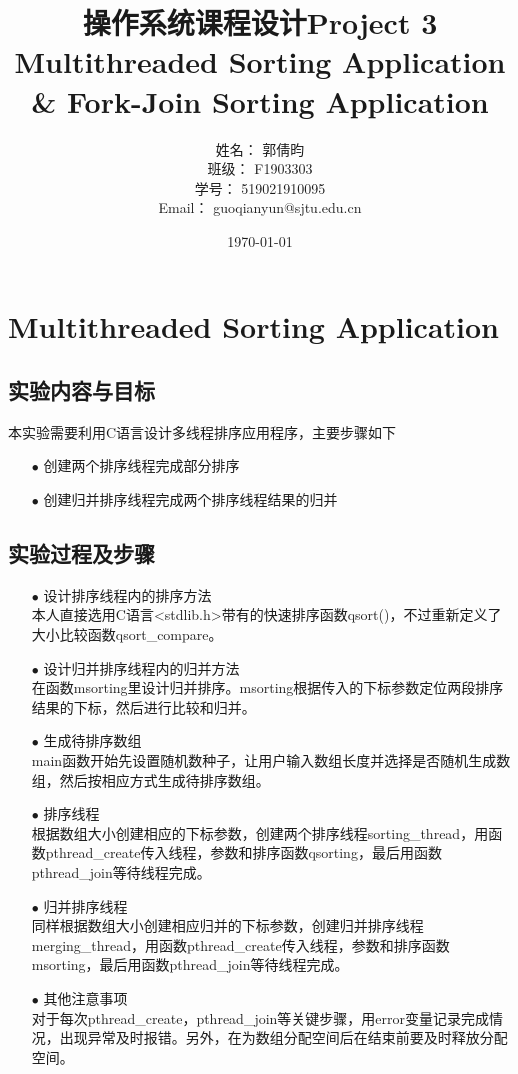 \documentclass{article}
\title{\textbf{操作系统课程设计Project 3\\Multithreaded Sorting Application\\ \& Fork-Join Sorting Application}} %
\author{姓名： 郭倩昀  
\\班级： F1903303  
\\学号： 519021910095  
\\Email： guoqianyun@sjtu.edu.cn} %
\date{\today} %
\begin{document}
\maketitle %
\tableofcontents
\newpage
\section{Multithreaded Sorting Application}
\subsection{实验内容与目标}
本实验需要利用C语言设计多线程排序应用程序，主要步骤如下
\begin{itemize}
\item[$\bullet$]创建两个排序线程完成部分排序
\item[$\bullet$]创建归并排序线程完成两个排序线程结果的归并
\end{itemize}
\subsection{实验过程及步骤}
\begin{itemize}
\item[$\bullet$]设计排序线程内的排序方法\\
本人直接选用C语言<stdlib.h>带有的快速排序函数qsort()，不过重新定义了大小比较函数qsort\_compare。
\item[$\bullet$]设计归并排序线程内的归并方法\\
在函数msorting里设计归并排序。msorting根据传入的下标参数定位两段排序结果的下标，然后进行比较和归并。
\item[$\bullet$]生成待排序数组\\
main函数开始先设置随机数种子，让用户输入数组长度并选择是否随机生成数组，然后按相应方式生成待排序数组。
\item[$\bullet$]排序线程\\
根据数组大小创建相应的下标参数，创建两个排序线程sorting\_thread，用函数pthread\_create传入线程，参数和排序函数qsorting，最后用函数pthread\_join等待线程完成。
\item[$\bullet$]归并排序线程\\
同样根据数组大小创建相应归并的下标参数，创建归并排序线程merging\_thread，用函数pthread\_create传入线程，参数和排序函数msorting，最后用函数pthread\_join等待线程完成。
\item[$\bullet$]其他注意事项\\
对于每次pthread\_create，pthread\_join等关键步骤，用error变量记录完成情况，出现异常及时报错。另外，在为数组分配空间后在结束前要及时释放分配空间。
\end{itemize}
\end{document}
